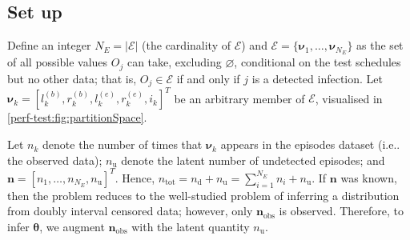 \documentclass[12pt]{article}
\makeatletter
\newcommand\set{\mathcal}
\renewcommand{\vec}[1]{\bm{#1}}
\newcommand{\ntot}{n_\text{tot}}
\newcommand{\ndet}{n_\text{d}}
\newcommand{\nnodet}{n_\text{u}}
\newcommand{\na}{\vec{n}_\text{obs}}
\DeclareRobustCommand\onedot{\futurelet\@let@token\@onedot}
\def\@onedot{\ifx\@let@token.\else.\null\fi\xspace}
\def\ie{i.e\onedot} \def\Ie{{I.e}\onedot}
\makeatother
\begin{document}
\subsection{Set up} \label{sec:inference}

Define an integer $N_E = |\set{E}|$ (the cardinality of $\set{E}$) and $\set{E} = \{ \vec{\nu}_1, \dots, \vec{\nu}_{N_E} \}$ as the set of all possible values $O_j$ can take, excluding $\varnothing$, conditional on the test schedules but no other data; that is, $O_j \in \set{E}$ if and only if $j$ is a detected infection.
Let $\vec{\nu}_k = [l^{(b)}_k, r^{(b)}_k, l^{(e)}_k, r^{(e)}_k, i_k]^T$ be an arbitrary member of $\set{E}$, visualised in \cref{perf-test:fig:partitionSpace}.

Let $n_k$ denote the number of times that $\vec{\nu}_k$ appears in the episodes dataset (\ie the observed data); $\nnodet$ denote the latent number of undetected episodes; and $\vec{n} = [n_1, \dots, n_{N_E}, \nnodet]^T$.
Hence, $\ntot = \ndet + \nnodet = \sum_{i=1}^{N_E} n_i + \nnodet$.
If $\vec{n}$ was known, then the problem reduces to the well-studied problem of inferring a distribution from doubly interval censored data; however, only $\na$ is observed.
Therefore, to infer $\vec\theta$, we augment $\na$ with the latent quantity $\nnodet$.
\end{document}
